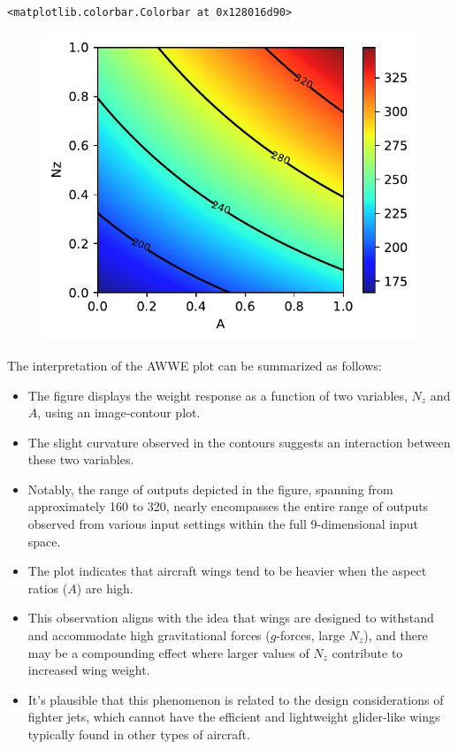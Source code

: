\documentclass[
  letterpaper,
  DIV=11,
  numbers=noendperiod]{scrreprt}
\providecommand{\tightlist}{%
  \setlength{\itemsep}{0pt}\setlength{\parskip}{0pt}}\usepackage{longtable,booktabs,array}
\begin{document}
\begin{verbatim}
<matplotlib.colorbar.Colorbar at 0x128016d90>
\end{verbatim}

\begin{figure}[H]

{\centering \includegraphics{002_awwe_files/figure-pdf/cell-6-output-2.pdf}

}

\end{figure}

The interpretation of the AWWE plot can be summarized as follows:

\begin{itemize}
\tightlist
\item
  The figure displays the weight response as a function of two
  variables, \(N_z\) and \(A\), using an image-contour plot.
\item
  The slight curvature observed in the contours suggests an interaction
  between these two variables.
\item
  Notably, the range of outputs depicted in the figure, spanning from
  approximately 160 to 320, nearly encompasses the entire range of
  outputs observed from various input settings within the full
  9-dimensional input space.
\item
  The plot indicates that aircraft wings tend to be heavier when the
  aspect ratios (\(A\)) are high.
\item
  This observation aligns with the idea that wings are designed to
  withstand and accommodate high gravitational forces (\(g\)-forces,
  large \(N_z\)), and there may be a compounding effect where larger
  values of \(N_z\) contribute to increased wing weight.
\item
  It's plausible that this phenomenon is related to the design
  considerations of fighter jets, which cannot have the efficient and
  lightweight glider-like wings typically found in other types of
  aircraft.
\end{itemize}
\end{document}
